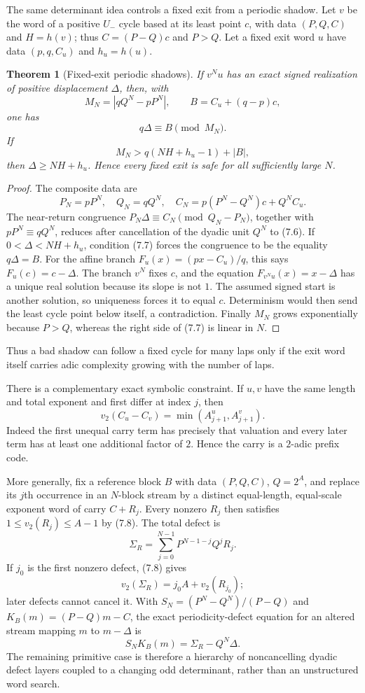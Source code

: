 \documentclass[11pt,reqno]{amsart}
\newtheorem{theorem}{Theorem}[section]
\theoremstyle{remark}
\newcommand{\Um}{U_{-}}
\newcommand{\vtwo}{v_2}
\begin{document}
The same determinant idea controls a fixed exit from a periodic shadow.  Let
$v$ be the word of a positive $\Um$ cycle based at its least point $c$, with
data $(P,Q,C)$ and $H=h(v)$; thus $C=(P-Q)c$ and $P>Q$.  Let a fixed exit word
$u$ have data $(p,q,C_u)$ and $h_u=h(u)$.

\begin{theorem}[Fixed-exit periodic shadows]\label{thm:fixedexit}
If $v^Nu$ has an exact signed realization of positive displacement $\Delta$,
then, with
\[
 M_N=|qQ^N-pP^N|,\qquad B=C_u+(q-p)c,
\]
one has
\[
 q\Delta\equiv B\pmod {M_N}.                         \tag{7.6}
\]
If
\[
 M_N>q(NH+h_u-1)+|B|,                                \tag{7.7}
\]
then $\Delta\ge NH+h_u$.  Hence every fixed exit is safe for all sufficiently
large $N$.
\end{theorem}

\begin{proof}
The composite data are
\[
 P_N=pP^N,\quad Q_N=qQ^N,\quad
 C_N=p(P^N-Q^N)c+Q^NC_u.
\]
The near-return congruence $P_N\Delta\equiv C_N\pmod{Q_N-P_N}$,
together with $pP^N\equiv qQ^N$, reduces after cancellation of the dyadic
unit $Q^N$ to (7.6).  If $0<\Delta<NH+h_u$, condition (7.7) forces the
congruence to be the equality $q\Delta=B$.  For the affine branch
$F_u(x)=(px-C_u)/q$, this says $F_u(c)=c-\Delta$.  The branch $v^N$ fixes
$c$, and the equation $F_{v^Nu}(x)=x-\Delta$ has a unique real solution
because its slope is not $1$.  The assumed signed start is another solution,
so uniqueness forces it to equal $c$.  Determinism would then
send the least cycle point below itself, a contradiction.  Finally $M_N$
grows exponentially because $P>Q$, whereas the right side of (7.7) is
linear in $N$.
\end{proof}

Thus a bad shadow can follow a fixed cycle for many laps only if the exit
word itself carries adic complexity growing with the number of laps.

There is a complementary exact symbolic constraint.  If $u,v$ have the same
length and total exponent and first differ at index $j$, then
\[
 \vtwo(C_u-C_v)=
 \min(A_{j+1}^{u},A_{j+1}^{v}).                       \tag{7.8}
\]
Indeed the first unequal carry term has precisely that valuation and every
later term has at least one additional factor of $2$.  Hence the carry is a
$2$-adic prefix code.

More generally, fix a reference block $B$ with data $(P,Q,C)$, $Q=2^A$, and
replace its $j$th occurrence in an $N$-block stream by a distinct
equal-length, equal-scale exponent word of carry $C+R_j$.  Every nonzero
$R_j$ then satisfies $1\le\vtwo(R_j)\le A-1$ by (7.8).  The total defect is
\[
 \Sigma_R=\sum_{j=0}^{N-1}P^{N-1-j}Q^jR_j.            \tag{7.9}
\]
If $j_0$ is the first nonzero defect, (7.8) gives
\[
 \vtwo(\Sigma_R)=j_0A+\vtwo(R_{j_0});                \tag{7.10}
\]
later defects cannot cancel it.  With
$S_N=(P^N-Q^N)/(P-Q)$ and $K_B(m)=(P-Q)m-C$, the exact
periodicity-defect equation for an altered stream mapping $m$ to
$m-\Delta$ is
\[
 S_NK_B(m)=\Sigma_R-Q^N\Delta.                       \tag{7.11}
\]
The remaining primitive case is therefore a hierarchy of noncancelling
dyadic defect layers coupled to a changing odd determinant, rather than an
unstructured word search.
\end{document}
